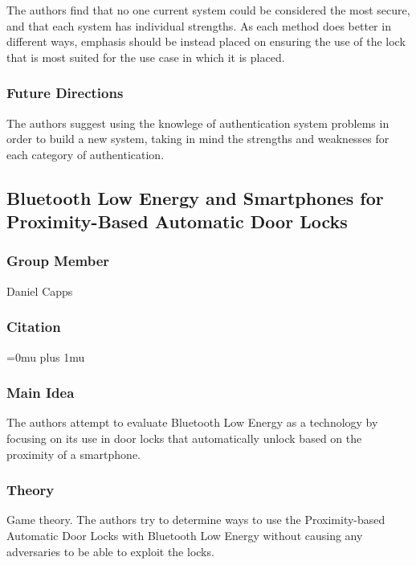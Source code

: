 \noindent
The authors find that no one current system could be considered the most secure, and that each system has individual strengths.  As each method does better in different ways, emphasis should be instead placed on ensuring the use of the lock that is most suited for the use case in which it is placed.  

\subsubsection{Future Directions}

\noindent
The authors suggest using the knowlege of authentication system problems in order to build a new system, taking in mind the strengths and weaknesses for each category of authentication.

\subsection{{B}luetooth {L}ow {E}nergy and {S}martphones for {P}roximity-{B}ased  {A}utomatic {D}oor {L}ocks}

\subsubsection{Group Member}

\noindent
Daniel Capps

\noindent
\subsubsection{Citation}

\Urlmuskip=0mu plus 1mu\relax

\subsubsection{Main Idea}

\noindent
The authors attempt to evaluate Bluetooth Low Energy as a technology by focusing on its use in door locks that automatically unlock based on the proximity of a smartphone.


\subsubsection{Theory}

\noindent
Game theory. The authors try to determine ways to use the Proximity-based Automatic Door Locks with Bluetooth Low Energy without causing any adversaries to be able to exploit the locks. 

